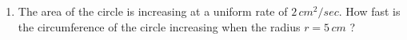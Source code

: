                            
\begin{enumerate}
\item The area of the circle is increasing at a uniform rate of $2\,cm^2/sec$. How fast is the circumference of the circle increasing when the radius $r = 5\,cm$ ?
\end{enumerate}
